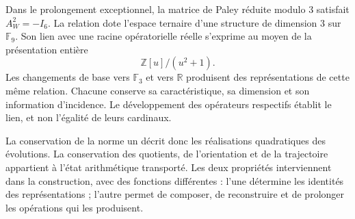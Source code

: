 Dans le prolongement exceptionnel, la matrice de Paley réduite modulo \(3\) satisfait \(A_W^2=-I_6\). La relation dote l'espace ternaire d'une structure de dimension \(3\) sur \(\mathbb F_9\). Son lien avec une racine opératorielle réelle s'exprime au moyen de la présentation entière
\[
 \mathbb Z[u]/(u^2+1).
\]
Les changements de base vers \(\mathbb F_3\) et vers \(\mathbb R\) produisent des
représentations de cette même relation. Chacune conserve sa caractéristique,
sa dimension et son information d'incidence. Le développement des
opérateurs respectifs établit le lien, et non l'égalité de leurs
cardinaux.

La conservation de la norme un décrit donc les réalisations
quadratiques des évolutions. La conservation des quotients, de l'orientation et de la
trajectoire appartient à l'état arithmétique transporté. Les deux propriétés
interviennent dans la construction, avec des fonctions différentes : l'une détermine les
identités des représentations ; l'autre permet de composer, de reconstruire et de
prolonger les opérations qui les produisent.
